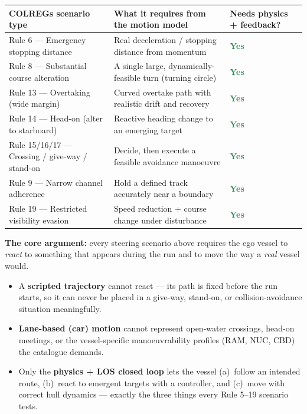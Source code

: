 \documentclass[11pt]{article}
\newcommand{\good}{\textcolor{seagreen}{\textbf{Yes}}}
\begin{document}
\begin{center}
\footnotesize
\renewcommand{\arraystretch}{1.3}
\begin{tabular}{p{4.2cm} p{6.5cm} >{\centering\arraybackslash}p{2.4cm}}
\toprule
\textbf{COLREGs scenario type} & \textbf{What it requires from the motion model} & \textbf{Needs physics + feedback?} \\
\midrule
Rule 6 --- Emergency stopping distance & Real deceleration / stopping distance from momentum & \good \\
Rule 8 --- Substantial course alteration & A single large, dynamically-feasible turn (turning circle) & \good \\
Rule 13 --- Overtaking (wide margin) & Curved overtake path with realistic drift and recovery & \good \\
Rule 14 --- Head-on (alter to starboard) & Reactive heading change to an emerging target & \good \\
Rule 15/16/17 --- Crossing / give-way / stand-on & Decide, then execute a feasible avoidance manoeuvre & \good \\
Rule 9 --- Narrow channel adherence & Hold a defined track accurately near a boundary & \good \\
Rule 19 --- Restricted visibility evasion & Speed reduction + course change under disturbance & \good \\
\bottomrule
\end{tabular}
\end{center}

\noindent\textbf{The core argument:} every steering scenario above requires the ego vessel to
\emph{react} to something that appears during the run and to move the way a \emph{real} vessel would.
\begin{itemize}[leftmargin=1.6em]
    \item A \textbf{scripted trajectory} cannot react --- its path is fixed before the run starts, so it
    can never be placed in a give-way, stand-on, or collision-avoidance situation meaningfully.
    \item \textbf{Lane-based (car) motion} cannot represent open-water crossings, head-on meetings, or
    the vessel-specific manoeuvrability profiles (RAM, NUC, CBD) the catalogue demands.
    \item Only the \textbf{physics + LOS closed loop} lets the vessel (a)~follow an intended route,
    (b)~react to emergent targets with a controller, and (c)~move with correct hull dynamics --- exactly
    the three things every Rule 5--19 scenario tests.
\end{itemize}
\end{document}
